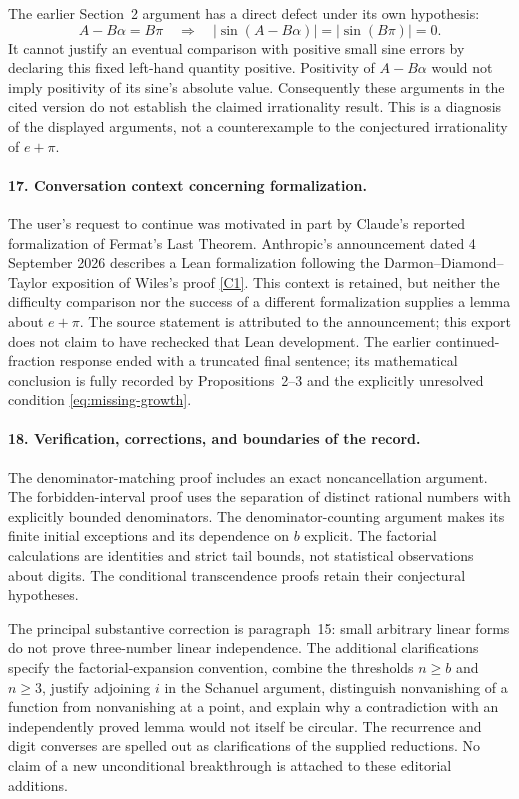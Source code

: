 \documentclass[11pt]{article}
\begin{document}
The earlier Section~2 argument has a direct defect under its own
hypothesis:
\[
 A-B\alpha=B\pi\quad\Longrightarrow\quad
 |\sin(A-B\alpha)|=|\sin(B\pi)|=0.
\]
It cannot justify an eventual comparison with positive small sine errors
by declaring this fixed left-hand quantity positive. Positivity of
$A-B\alpha$ would not imply positivity of its sine's absolute value.
Consequently these arguments in the cited version do not establish the
claimed irrationality result. This is a diagnosis of the displayed
arguments, not a counterexample to the conjectured irrationality of
$e+\pi$.

\paragraph{17. Conversation context concerning formalization.}
The user's request to continue was motivated in part by Claude's reported
formalization of Fermat's Last Theorem. Anthropic's announcement dated
4 September 2026 describes a Lean formalization following the
Darmon--Diamond--Taylor exposition of Wiles's proof
\href{https://www.anthropic.com/research/formalizing-fermats-last-theorem}{[C1]}.
This context is retained, but neither the difficulty comparison nor the
success of a different formalization supplies a lemma about $e+\pi$.
The source statement is attributed to the announcement; this export does
not claim to have rechecked that Lean development. The earlier
continued-fraction response ended with a truncated final sentence; its
mathematical conclusion is fully recorded by Propositions~2--3 and the
explicitly unresolved condition \eqref{eq:missing-growth}.

\paragraph{18. Verification, corrections, and boundaries of the record.}
The denominator-matching proof includes an exact noncancellation argument.
The forbidden-interval proof uses the separation of distinct rational
numbers with explicitly bounded denominators. The denominator-counting
argument makes its finite initial exceptions and its dependence on $b$
explicit. The factorial calculations are identities and strict tail bounds,
not statistical observations about digits. The conditional transcendence
proofs retain their conjectural hypotheses.

The principal substantive correction is paragraph~15: small arbitrary
linear forms do not prove three-number linear independence. The additional
clarifications specify the factorial-expansion convention, combine the
thresholds $n\ge b$ and $n\ge3$, justify adjoining $i$ in the Schanuel
argument, distinguish nonvanishing of a function from nonvanishing at a
point, and explain why a contradiction with an independently proved lemma
would not itself be circular. The recurrence and digit converses are
spelled out as clarifications of the supplied reductions. No claim of a
new unconditional breakthrough is attached to these editorial additions.
\end{document}
